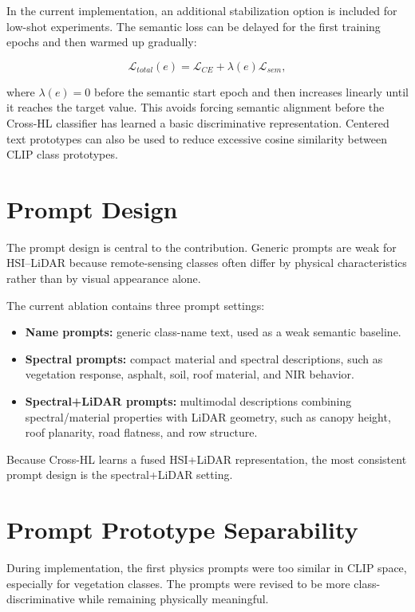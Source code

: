 \documentclass[10pt,journal,compsoc]{IEEEtran}
\begin{document}
In the current implementation, an additional stabilization option is included for low-shot experiments. The semantic loss can be delayed for the first training epochs and then warmed up gradually:

\begin{equation}
\mathcal{L}_{total}(e)=\mathcal{L}_{CE}+\lambda(e)\mathcal{L}_{sem},
\end{equation}

where $\lambda(e)=0$ before the semantic start epoch and then increases linearly until it reaches the target value. This avoids forcing semantic alignment before the Cross-HL classifier has learned a basic discriminative representation. Centered text prototypes can also be used to reduce excessive cosine similarity between CLIP class prototypes.

\section{Prompt Design}

The prompt design is central to the contribution. Generic prompts are weak for HSI--LiDAR because remote-sensing classes often differ by physical characteristics rather than by visual appearance alone.

The current ablation contains three prompt settings:

\begin{itemize}
    \item \textbf{Name prompts:} generic class-name text, used as a weak semantic baseline.
    \item \textbf{Spectral prompts:} compact material and spectral descriptions, such as vegetation response, asphalt, soil, roof material, and NIR behavior.
    \item \textbf{Spectral+LiDAR prompts:} multimodal descriptions combining spectral/material properties with LiDAR geometry, such as canopy height, roof planarity, road flatness, and row structure.
\end{itemize}

Because Cross-HL learns a fused HSI+LiDAR representation, the most consistent prompt design is the spectral+LiDAR setting.

\section{Prompt Prototype Separability}

During implementation, the first physics prompts were too similar in CLIP space, especially for vegetation classes. The prompts were revised to be more class-discriminative while remaining physically meaningful.
\end{document}
